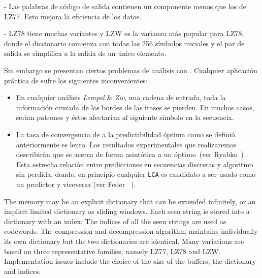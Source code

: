 - Las palabras de código de salida contienen un componente 
menos que los de LZ77. Esto mejora la eficiencia de los datos.

- LZ78 tiene muchas variantes y LZW es la varianza más popular para LZ78, 
donde el diccionario comienza con todas las 256 símbolos iniciales 
y el par de salida se simplifica a la salida de un único elemento.





Sin embargo se presentan ciertos problemas de análisis con \lzSieteOcho. Cualquier aplicación práctica de \lzSieteOcho sufre  los siguientes inconvenientes: 

\begin{itemize}
	\menorEspacioItemize	
	\item En cualquier análisis \emph{Lempel} \& \emph{Ziv}, una cadena de entrada, toda la información cruzada de los bordes de las frases se pierden. En muchos casos, serian patrones y éstos afectarían al siguiente símbolo en la secuencia.
	
	\item La tasa de convergencia de \lzSieteOcho a la predictibilidad óptima como se definió anteriormente es lento. Los resultados experimentales que realizaremos  describirán que \lzSieteOcho se acerca de forma asintótica a un óptimo~(ver Ryabko~\etal \cite{Ryabko2002}) . Esta estrecha relación entre predicciones en secuencias discretas y algoritmo sin perdida, donde, en principio cualquier \texttt{LCA} es candidato a ser usado como un predictor y viceversa (ver Feder \etal~\cite{Feder1992}). 
	
\end{itemize}



The memory may be an explicit dictionary that can be extended infinitely, or an implicit limited dictionary as sliding windows. Each seen string is stored into a dictionary with an index. The indices of all the seen strings are used as codewords. The compression and decompression algorithm maintains individually its own dictionary but the two dictionaries are identical. Many variations are based on three representative families, namely LZ77, LZ78 and LZW. Implementation issues include the choice of the size of the buffers, the dictionary and indices.

